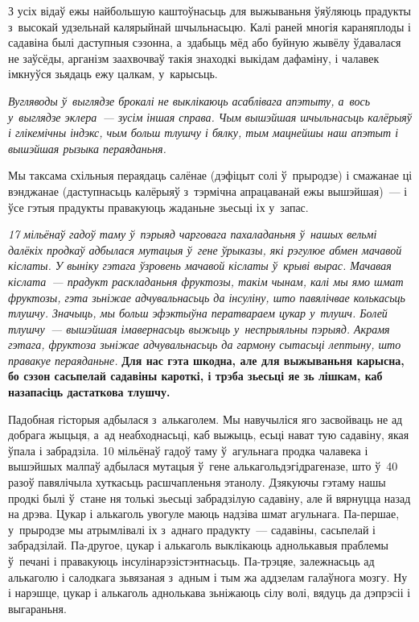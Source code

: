 
З усіх відаў ежы найбольшую каштоўнасьць для выжываньня ўяўляюць прадукты з~высокай удзельнай калярыйнай шчыльнасьцю. Калі раней многія караняплоды і садавіна былі даступныя сэзонна, а~здабыць мёд або буйную жывёлу ўдавалася не заўсёды, арганізм заахвочваў такія знаходкі выкідам дафаміну, і чалавек імкнуўся зьядаць ежу цалкам, у~карысьць.

\emph{Вугляводы ў~выглядзе брокалі не выклікаюць асаблівага апэтыту, а~вось у~выглядзе эклера~--- зусім іншая справа. Чым вышэйшая шчыльнасьць калёрыяў і глікемічны індэкс, чым больш тлушчу і бялку, тым мацнейшы наш апэтыт і вышэйшая рызыка пераяданьня.}

Мы таксама схільныя пераядаць салёнае (дэфіцыт солі ў~прыродзе) і смажанае ці вэнджанае (даступнасьць калёрыяў з~тэрмічна апрацаванай ежы вышэйшая)~--- і ўсе гэтыя прадукты правакуюць жаданьне зьесьці іх у~запас.

\emph{17 мільёнаў гадоў таму ў~пэрыяд чарговага пахаладаньня ў~нашых вельмі далёкіх продкаў адбылася мутацыя ў~гене ўрыказы, які рэгулюе абмен мачавой кіслаты. У выніку гэтага ўзровень мачавой кіслаты ў~крыві вырас. Мачавая кіслата~--- прадукт раскладаньня фруктозы, такім чынам, калі мы ямо шмат фруктозы, гэта зьніжае адчувальнасьць да інсуліну, што павялічвае колькасьць тлушчу. Значыць, мы больш эфэктыўна ператвараем цукар у~тлушч. Болей тлушчу~--- вышэйшая імавернасьць выжыць у~неспрыяльны пэрыяд. Акрамя гэтага, фруктоза зьніжае адчувальнасьць да гармону сытасьці лептыну, што правакуе пераяданьне.} \textbf{Для нас гэта шкодна, але для выжываньня карысна, бо сэзон сасьпелай садавіны кароткі, і трэба зьесьці яе зь лішкам, каб назапасіць дастаткова тлушчу.}

Падобная гісторыя адбылася з~алькаголем. Мы навучыліся яго засвойваць не ад добрага жыцьця, а~ад неабходнасьці, каб выжыць, есьці нават тую садавіну, якая ўпала і забрадзіла. 10 мільёнаў гадоў таму ў~агульнага продка чалавека і вышэйшых малпаў адбылася мутацыя ў~гене алькагольдэгідрагеназе, што ў~40 разоў павялічыла хуткасьць расшчапленьня этанолу. Дзякуючы гэтаму нашы продкі былі ў~стане ня толькі зьесьці забрадзілую садавіну, але й вярнуцца назад на дрэва. Цукар і алькаголь увогуле маюць надзіва шмат агульнага. Па-першае, у~прыродзе мы атрымлівалі іх з~аднаго прадукту~--- садавіны, сасьпелай і забрадзілай. Па-другое, цукар і алькаголь выклікаюць аднолькавыя праблемы ў~печані і правакуюць інсулінарэзістэнтнасьць. Па-трэцяе, залежнасьць ад алькаголю і салодкага зьвязаная з~адным і тым жа аддзелам галаўнога мозгу. Ну і нарэшце, цукар і алькаголь аднолькава зьніжаюць сілу волі, вядуць да дэпрэсіі і выгараньня.

